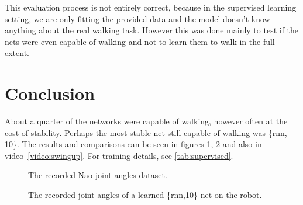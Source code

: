 This evaluation process is not entirely correct, because in the supervised learning setting, we are only fitting the provided data and the model doesn't know anything about the real walking task. However this was done mainly to test if the nets were even capable of walking and not to learn them to walk in the full extent.


\section{Conclusion}

About a quarter of the networks were capable of walking, however often at the cost of stability. Perhaps the most stable net still capable of walking was \{rnn, 10\}. The results and comparisons can be seen in figures \ref{plot:joints}, \ref{plot:joints2} and also in video~\ref{video:swingup}. For training details, see \ref{tab:supervised}.

\newpage

\begin{figure}[h!]

\caption{The recorded Nao joint angles dataset.}
\centering
\label{plot:joints}
\end{figure}
\begin{figure}[h!]

\caption{The recorded joint angles of a learned \{rnn,10\} net on the robot.}
\centering
\label{plot:joints2}
\end{figure}